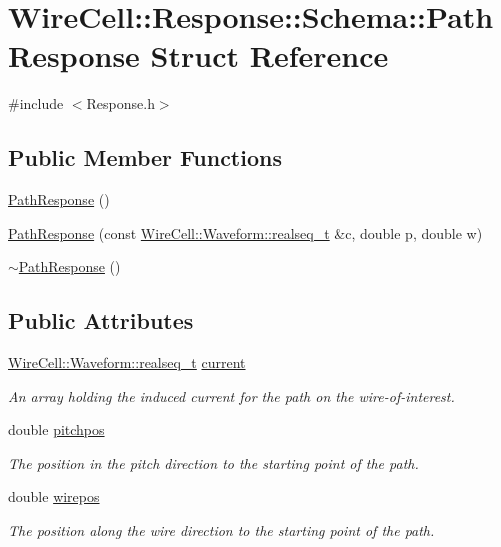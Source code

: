 \hypertarget{struct_wire_cell_1_1_response_1_1_schema_1_1_path_response}{}\section{Wire\+Cell\+:\+:Response\+:\+:Schema\+:\+:Path\+Response Struct Reference}
\label{struct_wire_cell_1_1_response_1_1_schema_1_1_path_response}


{\ttfamily \#include $<$Response.\+h$>$}

\subsection*{Public Member Functions}
\begin{DoxyCompactItemize}
\item 
\hyperlink{struct_wire_cell_1_1_response_1_1_schema_1_1_path_response_aa6b6768b2283c2004b2e30568fddf511}{Path\+Response} ()
\item 
\hyperlink{struct_wire_cell_1_1_response_1_1_schema_1_1_path_response_a1bca5ef0a4aded0b12f1dba65fe9d554}{Path\+Response} (const \hyperlink{namespace_wire_cell_1_1_waveform_a479175e541c8545e87cd8063b74b6956}{Wire\+Cell\+::\+Waveform\+::realseq\+\_\+t} \&c, double p, double w)
\item 
\hyperlink{struct_wire_cell_1_1_response_1_1_schema_1_1_path_response_a0e6677f86c80943d1c70a8a9ad1af4e1}{$\sim$\+Path\+Response} ()
\end{DoxyCompactItemize}
\subsection*{Public Attributes}
\begin{DoxyCompactItemize}
\item 
\hyperlink{namespace_wire_cell_1_1_waveform_a479175e541c8545e87cd8063b74b6956}{Wire\+Cell\+::\+Waveform\+::realseq\+\_\+t} \hyperlink{struct_wire_cell_1_1_response_1_1_schema_1_1_path_response_a7345921b89c3f71394ccd990c85c3ca2}{current}
\begin{DoxyCompactList}\small\item\em An array holding the induced current for the path on the wire-\/of-\/interest. \end{DoxyCompactList}\item 
double \hyperlink{struct_wire_cell_1_1_response_1_1_schema_1_1_path_response_aca7140e1cc69416034b6d01c34ecc780}{pitchpos}
\begin{DoxyCompactList}\small\item\em The position in the pitch direction to the starting point of the path. \end{DoxyCompactList}\item 
double \hyperlink{struct_wire_cell_1_1_response_1_1_schema_1_1_path_response_ad1beaec9fa3131397c5c19b9ce2a9282}{wirepos}
\begin{DoxyCompactList}\small\item\em The position along the wire direction to the starting point of the path. \end{DoxyCompactList}\end{DoxyCompactItemize}


